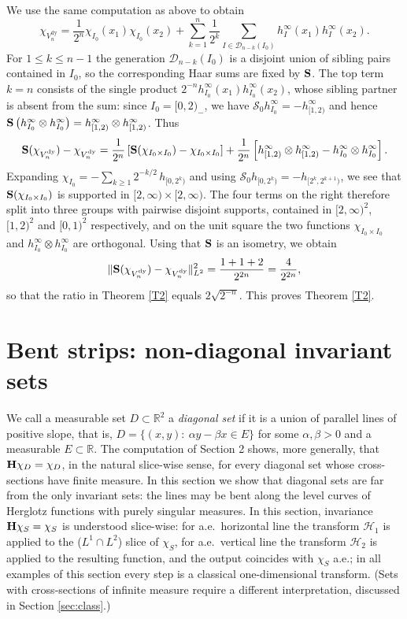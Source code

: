 \documentclass{article}
\newcommand{\tmop}[1]{\ensuremath{\operatorname{#1}}}
\def\H{{\bf H}}
\def\S{{\bf S}}
\def\HH{{\mathcal H}}
\def\R{{\mathbb R}}
\begin{document}
	We use the same computation as above to obtain
	\[ \chi_{V^{\tmop{dy}}_n} = \frac{1}{2^n} \chi_{I_0} (x_1) \chi_{I_0} (x_2) +
	\sum_{k = 1}^n \frac{1}{2^k} \sum_{I \in \mathcal{D}_{n - k}(I_0)} h^{\infty}_I
	(x_1) h^{\infty}_I (x_2) . \]
	For $1\leq k\leq n-1$ the generation $\mathcal D_{n-k}(I_0)$ is a disjoint union of sibling pairs contained in $I_0$, so the corresponding Haar sums are fixed by $\S$. The top term $k=n$ consists of the single product $2^{-n}h^\infty_{I_0}(x_1)h^\infty_{I_0}(x_2)$, whose sibling partner is absent from the sum: since $I_0=[0,2)_-$, we have $\mathcal S_0 h^\infty_{I_0}=-h^\infty_{[1,2)}$ and hence $\S \left(h^\infty_{I_0}\otimes h^\infty_{I_0}\right)=h^\infty_{[1,2)}\otimes h^\infty_{[1,2)}$.
	Thus
	\[ \S (\chi_{V^{\tmop{dy}}_n}) -
	\chi_{V^{\tmop{dy}}_n} = \frac{1}{2^n}\left[ \S
	(\chi_{I_0 \times I_0}) - \chi_{I_0 \times I_0}\right] + \frac{1}{2^n}\left[h^\infty_{[1,2)}\otimes h^\infty_{[1,2)} - h^\infty_{I_0}\otimes h^\infty_{I_0}\right] . \]
	Expanding $\chi_{I_0} = -\sum_{k \geq 1} 2^{-k/2}\, h_{[0,2^k)}$ and using $\mathcal S_0 h_{[0,2^k)} = -h_{[2^k,2^{k+1})}$, we see that $\S(\chi_{I_0\times I_0})$ is supported in $[2,\infty)\times[2,\infty)$. The four terms on the right therefore split into three groups with pairwise disjoint supports, contained in $[2,\infty)^2$, $[1,2)^2$ and $[0,1)^2$ respectively, and on the unit square the two functions $\chi_{I_0\times I_0}$ and $h^\infty_{I_0}\otimes h^\infty_{I_0}$ are orthogonal. Using that
	$\S$ is an isometry, we obtain
	\[ \| \S (\chi_{V^{\tmop{dy}}_n}) -
	\chi_{V^{\tmop{dy}}_n} \|^2_{L^2} = \frac{1+1+2}{2^{2 n}}=\frac{4}{2^{2n}} , \]
	so that the ratio in Theorem \ref{T2} equals $2\sqrt{2^{-n}}$. This proves Theorem \ref{T2}.

	\section{Bent strips: non-diagonal invariant sets}\label{sec:bent}

	We call a measurable set $D\subset\R^2$ a \emph{diagonal set} if it is a union of parallel lines of positive slope, that is, $D=\{(x,y):\ \alpha y-\beta x\in E\}$ for some $\alpha,\beta>0$ and a measurable $E\subset\R$. The computation of Section 2 shows, more generally, that $\H\chi_D=\chi_D$, in the natural slice-wise sense, for every diagonal set whose cross-sections have finite measure. In this section we show that diagonal sets are far from the only invariant sets: the lines may be bent along the level curves of Herglotz functions with purely singular measures. In this section, invariance $\H\chi_S=\chi_S$ is understood slice-wise: for a.e.\ horizontal line the transform $\HH_1$ is applied to the ($L^1\cap L^2$) slice of $\chi_S$, for a.e.\ vertical line the transform $\HH_2$ is applied to the resulting function, and the output coincides with $\chi_S$ a.e.; in all examples of this section every step is a classical one-dimensional transform. (Sets with cross-sections of infinite measure require a different interpretation, discussed in Section \ref{sec:class}.)
\end{document}

